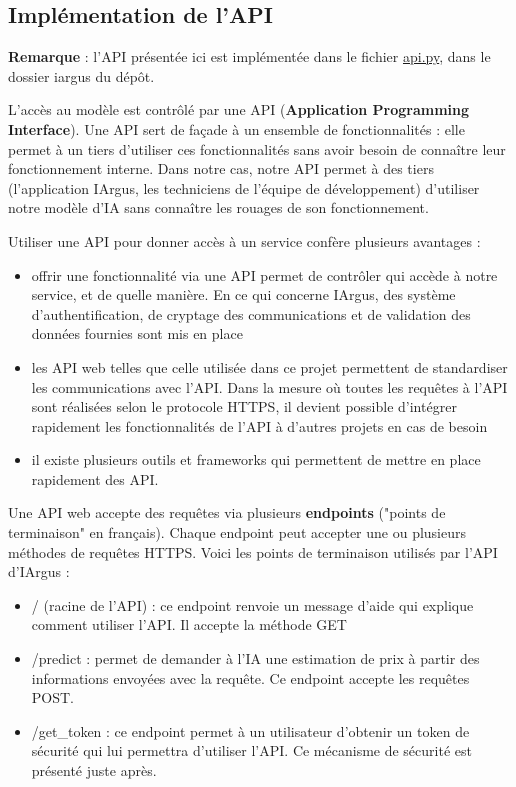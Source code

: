 \documentclass[french]{article}
\begin{document}
    \subsection{Implémentation de l'API}

    \textbf{Remarque} : l'API présentée ici est implémentée dans le fichier \href{https://github.com/vinpap/iargus/blob/08493c829a37590847164a2f695db763736b9e35/iargus/api.py}{api.py}, dans le dossier iargus du dépôt.

    L'accès au modèle est contrôlé par une API (\textbf{Application Programming Interface}). Une API sert de façade à un ensemble de fonctionnalités : elle permet à un tiers d'utiliser ces fonctionnalités sans avoir besoin de connaître leur fonctionnement interne. Dans notre cas, notre API permet à des tiers (l'application IArgus, les techniciens de l'équipe de développement) d'utiliser notre modèle d'IA sans connaître les rouages de son fonctionnement.

    Utiliser une API pour donner accès à un service confère plusieurs avantages :
    \begin{itemize}
        \item offrir une fonctionnalité via une API permet de contrôler qui accède à notre service, et de quelle manière. En ce qui concerne IArgus, des système d'authentification, de cryptage des communications et de validation des données fournies sont mis en place
        \item les API web telles que celle utilisée dans ce projet permettent de standardiser les communications avec l'API. Dans la mesure où toutes les requêtes à l'API sont réalisées selon le protocole HTTPS, il devient possible d'intégrer rapidement les fonctionnalités de l'API à d'autres projets en cas de besoin
        \item il existe plusieurs outils et frameworks qui permettent de mettre en place rapidement des API. 
    \end{itemize}
    Une API web accepte des requêtes via plusieurs \textbf{endpoints} ("points de terminaison" en français). Chaque endpoint peut accepter une ou plusieurs méthodes de requêtes HTTPS. Voici les points de terminaison utilisés par l'API d'IArgus :
    \begin{itemize}
        \item / (racine de l'API) : ce endpoint renvoie un message d'aide qui explique comment utiliser l'API. Il accepte la méthode GET
        \item /predict : permet de demander à l'IA une estimation de prix à partir des informations envoyées avec la requête. Ce endpoint accepte les requêtes POST.
        \item /get\_token : ce endpoint permet à un utilisateur d'obtenir un token de sécurité qui lui permettra d'utiliser l'API. Ce mécanisme de sécurité est présenté juste après.
    \end{itemize}
\end{document}
